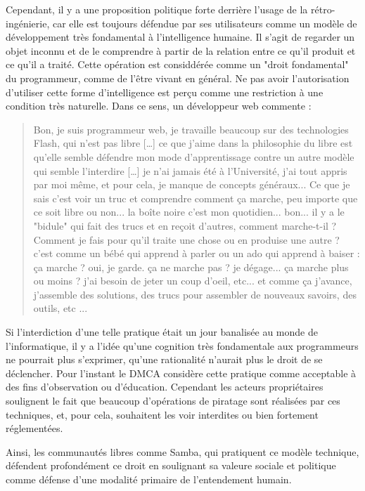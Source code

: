Cependant, il y a une proposition politique forte derrière l'usage de la rétro-ingénierie, car elle est toujours défendue par ses utilisateurs comme un modèle de développement très fondamental à l'intelligence humaine. Il s'agit de regarder un objet inconnu et de le comprendre à partir de la relation entre ce qu'il produit et ce qu'il a traité. Cette opération est considdérée comme un "droit fondamental" du programmeur, comme de l'être vivant en général. Ne pas avoir l'autorisation d'utiliser cette forme d'intelligence est perçu comme une restriction à une condition très naturelle. Dans ce sens, un développeur web commente :

\begin{quote}
Bon, je suis programmeur web, je travaille beaucoup sur des technologies Flash, qui n'est pas libre [\ldots] ce que j'aime dans la philosophie du libre est qu'elle semble défendre mon mode d'apprentissage contre un autre modèle qui semble l'interdire [\ldots] je n'ai jamais été à l'Université, j'ai tout appris par moi même, et pour cela, je manque de concepts généraux... Ce que je sais c'est voir un truc et comprendre comment ça marche, peu importe que ce soit libre ou non... la boîte noire c'est mon quotidien... bon... il y a le "bidule" qui fait des trucs et en reçoit d'autres, comment marche-t-il ? Comment je fais pour qu'il traite une chose ou en produise une autre ? c'est comme un bébé qui apprend à parler ou un ado qui apprend à baiser : ça marche ? oui, je garde. ça ne marche pas ? je dégage... ça marche plus ou moins ? j'ai besoin de jeter un coup d'oeil, etc... et comme ça j'avance, j'assemble des solutions, des trucs pour assembler de nouveaux savoirs, des outils, etc ...
\end{quote}

Si l'interdiction d'une telle pratique était un jour banalisée au monde de l'informatique, il y a l'idée qu'une cognition très fondamentale aux programmeurs ne pourrait plus s'exprimer, qu'une rationalité n'aurait plus le droit de se déclencher. Pour l'instant le DMCA considère cette pratique comme acceptable à des fins d'observation ou d'éducation. Cependant les acteurs propriétaires soulignent le fait que beaucoup d'opérations de piratage sont réalisées par ces techniques, et, pour cela, souhaitent les voir interdites ou bien fortement réglementées.

Ainsi, les communautés libres comme Samba, qui pratiquent ce modèle technique, défendent profondément ce droit en soulignant sa valeure sociale et politique comme défense d'une modalité primaire de l'entendement humain.

